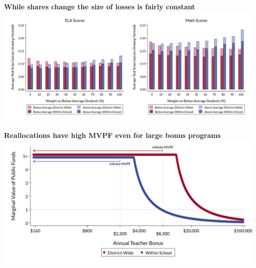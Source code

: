 \documentclass[t,aspectratio=169,11pt,presentation]{beamer}
\begin{document}
\begin{frame}[c,label=loser]{\textbf{While shares change the size of losses is fairly constant}}
\centering
 \includegraphics[width=.95\textwidth]{Working_Slides/WS_Figures/A4_losssize.pdf}

 \raggedright
 \vfill
 \hyperlink{equity3}{}
\end{frame}


\begin{frame}[c,label=mvpf]{\textbf{Reallocations have high MVPF even for large bonus programs}}
\centering
 \includegraphics[width=.95\textwidth]{Working_Slides/WS_Figures/05_MVPF.pdf}
 \raggedright
 \vfill
 \hyperlink{conc2}{}
\end{frame}
\end{document}
